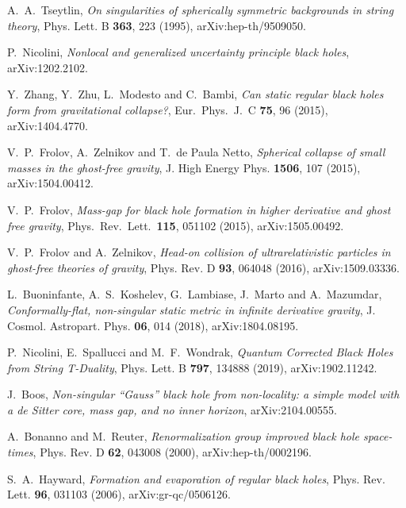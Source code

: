 \documentclass[aps,prd,a4paper,twocolumn,showpacs,showkeys,preprintnumbers,amsmath,amssymb,nofootinbib,usenames,dvipsnames]{revtex4-2}
\begin{document}
\begin{thebibliography}{99}
A.~A.~Tseytlin,
{\it On singularities of spherically symmetric backgrounds in string theory},
Phys. Lett. B \textbf{363}, 223 (1995),
arXiv:hep-th/9509050.

P.~Nicolini,
{\it Nonlocal and generalized uncertainty principle black holes},
arXiv:1202.2102.

Y.~Zhang, Y.~Zhu, L.~Modesto and C.~Bambi,
{\it Can static regular black holes form from gravitational collapse?},
Eur.\ Phys.\ J.\ C {\bf 75}, 96 (2015),
arXiv:1404.4770.

V.~P.~Frolov, A.~Zelnikov and T.~de Paula Netto,
{\it Spherical collapse of small masses in the ghost-free gravity},
J. High Energy Phys. {\bf 1506}, 107 (2015), arXiv:1504.00412.

V.~P.~Frolov,
{\it Mass-gap for black hole formation in higher derivative and ghost free gravity},
Phys.\ Rev.\ Lett.\  {\bf 115}, 051102 (2015), arXiv:1505.00492.

V.~P.~Frolov and A.~Zelnikov,
{\it Head-on collision of ultrarelativistic particles in ghost-free theories of gravity},
Phys. Rev. D {\bf 93}, 064048 (2016), arXiv:1509.03336.

L.~Buoninfante, A.~S.~Koshelev, G.~Lambiase, J.~Marto and A.~Mazumdar,
{\it Conformally-flat, non-singular static metric in infinite derivative gravity},
J. Cosmol. Astropart. Phys. \textbf{06}, 014 (2018),
arXiv:1804.08195.

P.~Nicolini, E.~Spallucci and M.~F.~Wondrak,
{\it Quantum Corrected Black Holes from String T-Duality},
Phys. Lett. B \textbf{797}, 134888 (2019),
arXiv:1902.11242.

J.~Boos,
{\it Non-singular ``Gauss'' black hole from non-locality: a simple model with a de Sitter core, mass gap, and no inner horizon}, 
arXiv:2104.00555.



A.~Bonanno and M.~Reuter,
{\it Renormalization group improved black hole space-times},
Phys. Rev. D \textbf{62}, 043008 (2000),
arXiv:hep-th/0002196.

S.~A.~Hayward,
{\it Formation and evaporation of regular black holes},
Phys. Rev. Lett. \textbf{96}, 031103 (2006),
arXiv:gr-qc/0506126.


\end{thebibliography}
\end{document}
